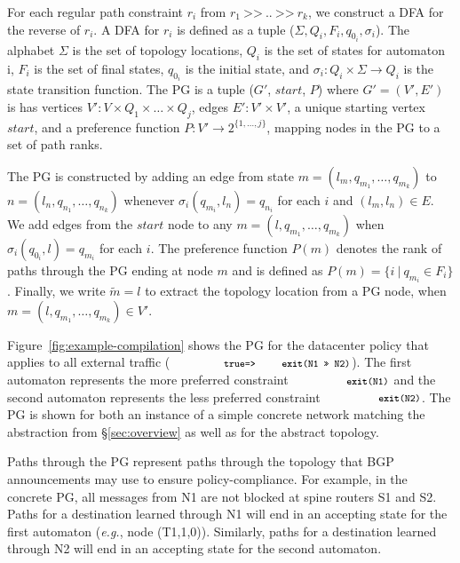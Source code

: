 \documentclass[numbers, 10pt, preprint]{sigplanconf}
\newcommand{\EG}{\emph{e.g.}}
\newcommand{\set}[1]{\ensuremath{\{ #1 \} }}
\newcommand{\CD}[1]{\texttt{\small #1}}  %
\newcommand{\KW}[1]{\texttt{\small\bfseries{#1}}}
\newcommand{\True}{\CD{true}}
\newcommand{\Prefer}{\texttt{>>}}
\newcommand{\Path}{\texttt{=>}}
\newcommand{\Exit}{\KW{exit}}
\begin{document}
For each regular path constraint $r_i$ from $r_1 ~\Prefer~ .. ~\Prefer~ r_k$, we construct a DFA for the reverse of $r_i$. A DFA for $r_i$ is defined as a tuple ($\Sigma, Q_i, F_i, q_{0_i}, \sigma_i$). The alphabet $\Sigma$ is the set of topology locations, $Q_i$ is the set of states for automaton i, $F_i$ is the set of final states, $q_{0_i}$ is the initial state, and $\sigma_i \colon Q_i \times \Sigma \rightarrow Q_i$ is the state transition function.
%
The PG is a tuple ($G'$, $start$, $P$) where $G' = (V',E')$ is has
vertices $V' \colon V \times Q_1 \times \dots \times Q_j$,
edges $E' \colon V' \times V'$,
a unique starting vertex $start$,
and a preference function $P \colon V' \rightarrow 2^{\set{1, \dots, j}}$, mapping nodes in the PG to a set of path ranks.

The PG is constructed by adding an edge from state $m = (l_m, q_{m_1}, \dots, q_{m_k})$ to $n = (l_n, q_{n_1}, \dots, q_{n_k})$ whenever $\sigma_i(q_{m_i}, l_n) = q_{n_i}$ for each $i$ and $(l_m,l_n) \in E$.
%
We add edges from the $\mathit{start}$ node to any $m = (l, q_{m_1}, \dots, q_{m_k})$ when $\sigma_i(q_{0_i}, l) = q_{m_i}$ for each $i$.
%
The preference function $P(m)$ denotes the rank of paths through the PG ending at node $m$ and is defined as $P(m) = \set{i~\vert~q_{m_i} \in F_i}$.
%
Finally, we write $\tilde{m} = l$ to extract the topology location from a PG node, when $m = (l, q_{m_1}, \dots, q_{m_k}) \in V'$.

Figure~\ref{fig:example-compilation} shows the PG for the datacenter policy that applies to all external traffic ($\CD{\True \Path \Exit(N1~\Prefer~N2)}$).
%
%
The first automaton represents the more preferred constraint $\CD{\Exit(N1)}$ and the second automaton represents the less preferred constraint $\CD{\Exit(N2)}$. The PG is shown for both an instance of a simple concrete network matching the abstraction from \S\ref{sec:overview} as well as for the abstract topology.

Paths through the PG represent paths through the topology that BGP announcements may use to ensure policy-compliance. For example, in the concrete PG, all messages from N1 are not blocked at spine routers S1 and S2. Paths for a destination learned through N1 will end in an accepting state for the first automaton (\EG, node (T1,1,0)). Similarly, paths for a destination learned through N2 will end in an accepting state for the second automaton.
\end{document}
